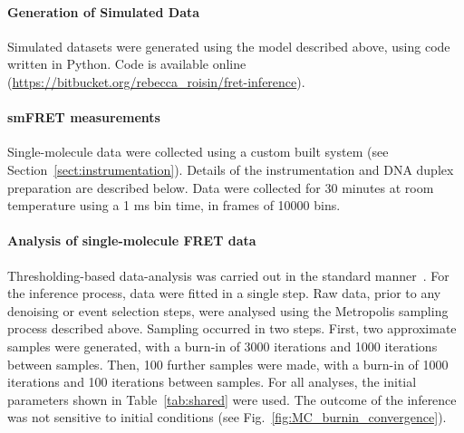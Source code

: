 \paragraph*{Generation of Simulated Data}
Simulated datasets were generated using the model described above, using code written in Python. Code is available online (\url{https://bitbucket.org/rebecca_roisin/fret-inference}). 

\paragraph*{smFRET measurements}
Single-molecule data were collected using a custom built system (see Section~\ref{sect:instrumentation}). Details of the instrumentation and DNA duplex preparation are described below. Data were collected for 30 minutes at room temperature using a 1 ms bin time, in frames of 10000 bins.

\paragraph*{Analysis of single-molecule FRET data}
Thresholding-based data-analysis was carried out in the standard manner~\cite{deniz01}.  For the inference process, data were fitted in a single step. Raw data, prior to any denoising or event selection steps, were analysed using the Metropolis sampling process described above. Sampling occurred in two steps. First, two approximate samples were generated, with a burn-in of 3000 iterations and 1000 iterations between samples. Then, 100 further samples were made, with a burn-in of 1000 iterations and 100 iterations between samples. For all analyses, the initial parameters shown in Table~\ref{tab:shared} were used. The outcome of the inference was not sensitive to initial conditions (see Fig.~\ref{fig:MC_burnin_convergence}).  


